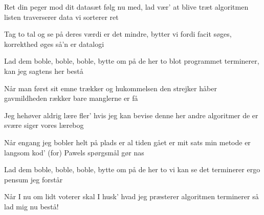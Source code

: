 \documentclass[a4paper,11pt]{article}
\begin{document}
\begin{song}
  Ret din peger mod dit datasæt
  følg nu med, lad vær' at blive træt
  algoritmen listen traverserer
  data vi sorterer ret

  Tag to tal og se på deres værdi
  er det mindre, bytter vi fordi
  facit søges, korrekthed øges
  så'n er datalogi

  Lad dem boble, boble, boble,
  bytte om på de her to
  blot programmet terminerer,
  kan jeg sagtens her bestå

  Når man først sit emne trækker
  og hukommelsen den strejker
  håber gavmildheden rækker
  bare manglerne er få

  Jeg hehøver aldrig lære fler'
  hvis jeg kan bevise denne her
  andre algoritmer de er svære
  siger vores lærebog

  Når engang jeg bobler helt på plads
  er al tiden gået er mit sats
  min metode er langsom kod' (for)
  Pawels spørgsmål gør nas

  Lad dem boble, boble, boble,
  bytte om på de her to
  vi kan se det terminerer
  ergo pensum jeg forstår

  Når I nu om lidt voterer
  skal I husk' hvad jeg præsterer
  algoritmen terminerer
  så lad mig nu bestå!
\end{song}
\end{document}
